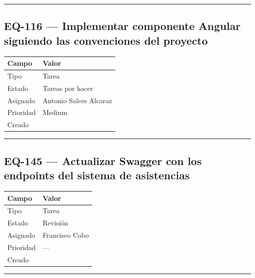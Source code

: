 \documentclass[
  spanish,
  11pt,
]{report}
\newcounter{none} %
\begin{document}
\begin{center}\rule{0.5\linewidth}{0.5pt}\end{center}

\subsection{EQ-116 --- Implementar componente Angular siguiendo las
convenciones del
proyecto}\label{eq-116-implementar-componente-angular-siguiendo-las-convenciones-del-proyecto}

{\def\LTcaptype{none} %
\begin{longtable}[]{@{}ll@{}}
\toprule\noalign{}
Campo & Valor \\
\midrule\noalign{}
\endhead
\bottomrule\noalign{}
\endlastfoot
Tipo & Tarea \\
Estado & Tareas por hacer \\
Asignado & Antonio Salces Alcaraz \\
Prioridad & Medium \\
Creado & \\
\end{longtable}
}

\begin{center}\rule{0.5\linewidth}{0.5pt}\end{center}

\subsection{EQ-145 --- Actualizar Swagger con los endpoints del sistema
de
asistencias}\label{eq-145-actualizar-swagger-con-los-endpoints-del-sistema-de-asistencias}

{\def\LTcaptype{none} %
\begin{longtable}[]{@{}ll@{}}
\toprule\noalign{}
Campo & Valor \\
\midrule\noalign{}
\endhead
\bottomrule\noalign{}
\endlastfoot
Tipo & Tarea \\
Estado & Revisión \\
Asignado & Francisco Cobo \\
Prioridad & --- \\
Creado & \\
\end{longtable}
}

\begin{center}\rule{0.5\linewidth}{0.5pt}\end{center}
\end{document}

